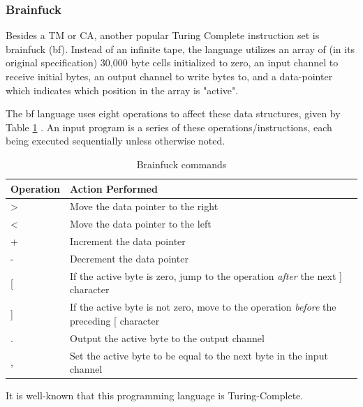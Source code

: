 \documentclass[runningheads]{llncs}
\begin{document}
\subsubsection{Brainfuck}
Besides a TM or CA, another popular Turing Complete instruction set is brainfuck (bf). Instead of an infinite tape, the language utilizes an array of (in its original specification) 30,000 byte cells initialized to zero, an input channel to receive initial bytes, an output channel to write bytes to, and a data-pointer which indicates which position in the array is "active".

The bf language uses eight operations to affect these data structures, given by Table \ref{table:bf} . An input program is a series of these operations/instructions, each being executed sequentially unless otherwise noted.
\begin{table}[H]
\begin{tabular}{l|l}
\textbf{Operation} & \textbf{Action Performed}                                                                \\ \hline
\textgreater{}     & Move the data pointer to the right                                                       \\
\textless{}        & Move the data pointer to the left                                                        \\
+                  & Increment the data pointer                                                               \\
-                  & Decrement the data pointer                                                               \\
{[}                & If the active byte is zero, jump to the operation \textit{after} the next {]} character           \\
{]}                & If the active byte is not zero, move to the operation \textit{before} the preceding {[} character \\
.                  & Output the active byte to the output channel                                             \\
,                  & Set the active byte to be equal to the next byte in the input channel
\end{tabular}
\vspace{1em}
\caption{Brainfuck commands}
\label{table:bf}
\end{table}

It is well-known that this programming language is Turing-Complete. %
\end{document}
